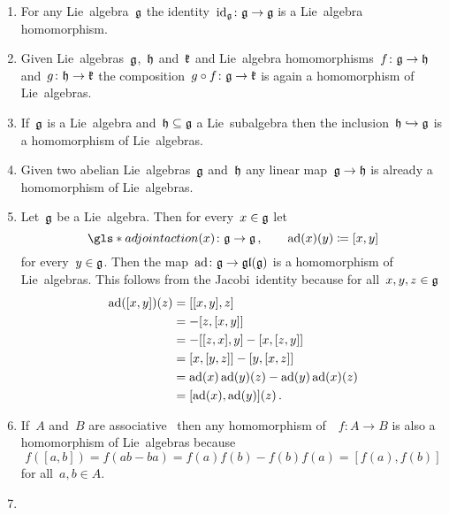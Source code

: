 \begin{examples}
  \label{homomorphisms of lie algebras}
  \leavevmode
  \begin{enumerate}
    \item
      For any Lie~algebra~$\mathfrak{g}$ the identity~$\operatorname{id}_{\mathfrak{g}} \colon \mathfrak{g} \to \mathfrak{g}$ is a Lie~algebra homomorphism.
    \item
      Given Lie~algebras~$\mathfrak{g}$,~$\mathfrak{h}$ and~$\mathfrak{k}$ and Lie~algebra homomorphisms~$f \colon \mathfrak{g} \to \mathfrak{h}$ and~$g \colon \mathfrak{h} \to \mathfrak{k}$ the composition~$g \circ f \colon \mathfrak{g} \to \mathfrak{k}$ is again a homomorphism of Lie~algebras.
    \item
      If~$\mathfrak{g}$ is a Lie~algebra and~$\mathfrak{h} \subseteq \mathfrak{g}$ a Lie~subalgebra then the inclusion~$\mathfrak{h} \hookrightarrow \mathfrak{g}$ is a homomorphism of Lie~algebras.
    \item
      Given two abelian Lie~algebras~$\mathfrak{g}$ and~$\mathfrak{h}$ any linear map~$\mathfrak{g} \to \mathfrak{h}$ is already a homomorphism of Lie~algebras.
    \item
      Let~$\mathfrak{g}$ be a Lie~algebra.
      Then for every~$x \in \mathfrak{g}$ let
      \[
        \gls*{adjoint action}(x)
        \colon
        \glie
        \to
        \glie \,,
        \qquad
        \ad(x)(y)
        \defined
        [x,y]
      \]
      for every~$y \in \mathfrak{g}$.
      Then the map~$\operatorname{ad} \colon \mathfrak{g} \to \mathfrak{gl}(\mathfrak{g})$ is a homomorphism of Lie~algebras.
      This follows from the Jacobi~identity because for all~$x,y,z \in \mathfrak{g}$
      \begin{align*}
          \operatorname{ad}([x,y])(z)
          &=
          [[x,y], z]
          \\
          &=
          - [z, [x,y]]
          \\
          &=
          - [[z,x], y] - [x, [z,y]]
          \\
          &=
          [x, [y,z]] - [y, [x,z]]
          \\
          &=
          \operatorname{ad}(x)\operatorname{ad}(y)(z) - \operatorname{ad}(y)\operatorname{ad}(x)(z)
          \\
          &=
          [\operatorname{ad}(x), \operatorname{ad}(y)](z) \,.
      \end{align*}
    \item
    If~$A$ and~$B$ are associative~{\algebras{$\kf$}} then any homomorphism of~{}~$f \colon A \to B$ is also a homomorphism of Lie~algebras because
    \[
      f([a,b])
      =
      f(ab - ba)
      =
      f(a)f(b) - f(b)f(a)
      =
      [f(a), f(b)]
    \]
    for all~$a, b \in A$.
  \item

\end{enumerate}
\end{examples}

